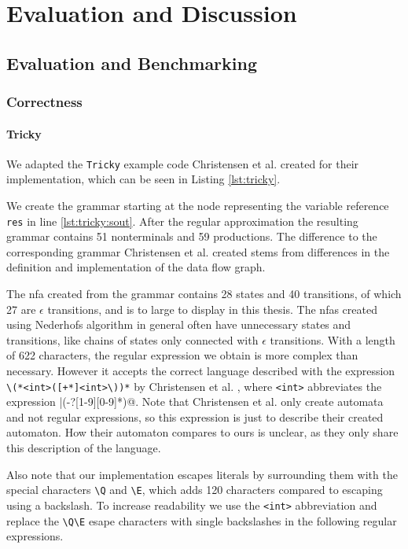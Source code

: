 \chapter{Evaluation and Discussion}
\label{chapter:Evaluation}

\section{Evaluation and Benchmarking}

\subsection{Correctness}

\subsubsection{Tricky}

We adapted the \lstinline|Tricky| example code Christensen et al. created for their implementation, which can be seen in Listing \ref{lst:tricky}.

We create the grammar starting at the node representing the variable reference \lstinline|res| in line \ref{lst:tricky:sout}.
After the regular approximation the resulting grammar contains 51 nonterminals and 59 productions.
The difference to the corresponding grammar Christensen et al. created stems from differences in the definition and implementation of the data flow graph.


The \ac{nfa} created from the grammar contains 28 states and 40 transitions, of which 27 are $\epsilon$ transitions, and is to large to display in this thesis.
The \acp{nfa} created using Nederhofs algorithm in general often have unnecessary states and transitions, like chains of states only connected with $\epsilon$ transitions.
With a length of 622 characters, the regular expression we obtain is more complex than necessary. However it accepts the correct language described with the expression \Verb|\(*<int>([+*]<int>\))*| by Christensen et al. \cite{brics}, where \Verb|<int>| abbreviates the expression |(-?[1-9][0-9]*)@. Note that Christensen et al. only create automata and not regular expressions, so this expression is just to describe their created automaton. How their automaton compares to ours is unclear, as they only share this description of the language.

Also note that our implementation escapes literals by surrounding them with the special characters \lstinline|\Q| and \lstinline|\E|, which adds 120 characters compared to escaping using a backslash.
To increase readability we use the \lstinline|<int>| abbreviation and replace the \lstinline|\Q\E| esape characters with single backslashes in the following regular expressions.

